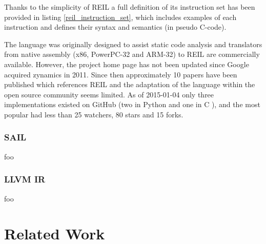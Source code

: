 \documentclass[12pt, a4paper]{article}
\begin{document}

Thanks to the simplicity of REIL a full definition of its instruction set has been provided in listing \ref{reil_instruction_set}, which includes examples of each instruction and defines their syntax and semantics (in pseudo C-code).





The language was originally designed to assist static code analysis and translators from native assembly (x86, PowerPC-32 and ARM-32) to REIL are commercially available. However, the project home page has not been updated since Google acquired zynamics in 2011. Since then approximately 10 papers have been published which references REIL and the adaptation of the language within the open source community seems limited. As of 2015-01-04 only three implementations existed on GitHub (two in Python \cite{barf,pyreil} and one in C \cite{bit}), and the most popular had less than 25 watchers, 80 stars and 15 forks.


\subsubsection{SAIL}


foo


\subsubsection{LLVM IR}

foo

\pagebreak


\section{Related Work}
\end{document}
